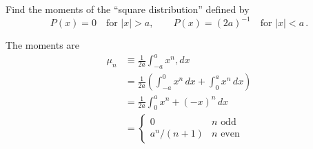 

Find the moments of the ``square distribution'' defined by
\begin{equation*}
P(x) = 0 \quad \text{for }|x|>a, \qquad P(x)=(2a)^{-1} \quad \text{for }|x|<a \, .
\end{equation*}


The moments are
\begin{align*}
\mu_n
&\equiv \frac{1}{2a} \int_{-a}^a x^n, dx \\
&= \frac{1}{2a} \left( \int_{-a}^0 x^n \, dx + \int_0^a x^n \, dx \right) \\
&= \frac{1}{2a}\int_0^a x^n + (-x)^n \, dx \\
&=
\left\{ \begin{array}{ll}
0 & n \text{ odd} \\
a^n/(n+1) & n \text{ even}
\end{array} \right.
\end{align*}